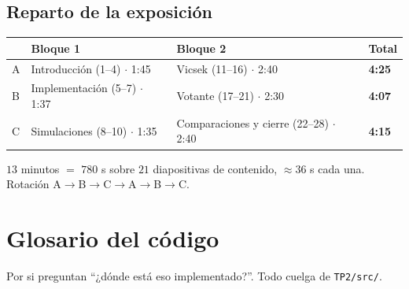 \documentclass[11pt]{article}
\begin{document}

\subsection{Reparto de la exposición}

\begin{center}
\begin{tabular}{llll}
  \toprule
  & Bloque 1 & Bloque 2 & Total \\
  \midrule
  A & Introducción (1--4) $\cdot$ 1:45 & Vicsek (11--16) $\cdot$ 2:40 & \textbf{4:25} \\
  B & Implementación (5--7) $\cdot$ 1:37 & Votante (17--21) $\cdot$ 2:30 & \textbf{4:07} \\
  C & Simulaciones (8--10) $\cdot$ 1:35 & Comparaciones y cierre (22--28) $\cdot$ 2:40 & \textbf{4:15} \\
  \bottomrule
\end{tabular}
\end{center}

$13$ minutos $=$ $780$ s sobre $21$ diapositivas de contenido, $\approx 36$ s
cada una. Rotación A$\to$B$\to$C$\to$A$\to$B$\to$C.

\section{Glosario del código}
\label{sec:codigo}

Por si preguntan ``¿dónde está eso implementado?''. Todo cuelga de
\texttt{TP2/src/}.
\end{document}
